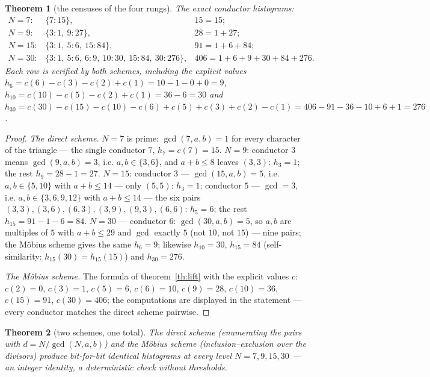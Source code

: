 \documentclass[11pt,a4paper]{article}
\theoremstyle{plain}
\newtheorem{theorem}{Theorem}
\theoremstyle{definition}
\theoremstyle{remark}
\begin{document}
\begin{theorem}[the censuses of the four rungs]\label{th:four}
The exact conductor histograms:
\[
\begin{array}{lll}
N=7: & \{7\colon 15\}, & 15=15;\\[0.15em]
N=9: & \{3\colon 1,\ 9\colon 27\}, & 28=1+27;\\[0.15em]
N=15: & \{3\colon 1,\ 5\colon 6,\ 15\colon 84\}, & 91=1+6+84;\\[0.15em]
N=30: & \{3\colon 1,\ 5\colon 6,\ 6\colon 9,\ 10\colon 30,\ 15\colon 84,\ 30\colon 276\}, & 406=1+6+9+30+84+276.
\end{array}
\]
Each row is verified by both schemes, including the explicit
values $h_6=c(6)-c(3)-c(2)+c(1)=10-1-0+0=9$,
$h_{10}=c(10)-c(5)-c(2)+c(1)=36-6=30$ and
$h_{30}=c(30)-c(15)-c(10)-c(6)+c(5)+c(3)+c(2)-c(1)
=406-91-36-10+6+1=276$.
\end{theorem}

\begin{proof}
\emph{The direct scheme.} $N=7$ is prime: $\gcd(7,a,b)=1$ for
every character of the triangle --- the single conductor $7$,
$h_7=c(7)=15$. $N=9$: conductor $3$ means $\gcd(9,a,b)=3$, i.e.
$a,b\in\{3,6\}$, and $a+b\le8$ leaves $(3,3)$: $h_3=1$; the rest
$h_9=28-1=27$. $N=15$: conductor $3$ --- $\gcd(15,a,b)=5$, i.e.
$a,b\in\{5,10\}$ with $a+b\le14$ --- only $(5,5)$: $h_3=1$;
conductor $5$ --- $\gcd=3$, i.e. $a,b\in\{3,6,9,12\}$ with
$a+b\le14$ --- the six pairs $(3,3),(3,6),(6,3),(3,9),(9,3),(6,6)$:
$h_5=6$; the rest $h_{15}=91-1-6=84$. $N=30$ --- conductor $6$:
$\gcd(30,a,b)=5$, so $a,b$ are multiples of $5$ with $a+b\le29$
and $\gcd$ exactly $5$ (not $10$, not $15$) --- nine pairs; the
M\"obius scheme gives the same $h_6=9$; likewise $h_{10}=30$,
$h_{15}=84$ (self-similarity: $h_{15}(30)=h_{15}(15)$) and
$h_{30}=276$.

\emph{The M\"obius scheme.} The formula of
theorem~\ref{th:lift} with the explicit values $c$: $c(2)=0$,
$c(3)=1$, $c(5)=6$, $c(6)=10$, $c(9)=28$, $c(10)=36$,
$c(15)=91$, $c(30)=406$; the computations are displayed in the
statement --- every conductor matches the direct scheme
pairwise.
\end{proof}

\begin{theorem}[two schemes, one total]\label{th:two}
The direct scheme (enumerating the pairs with
$d=N/\gcd(N,a,b)$) and the M\"obius scheme
(inclusion--exclusion over the divisors) produce
\emph{bit-for-bit identical} histograms at every level
$N=7,9,15,30$ --- an integer identity, a deterministic check
without thresholds.
\end{theorem}
\end{document}

